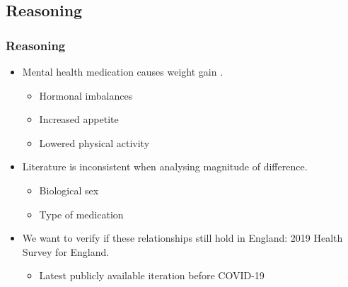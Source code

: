 \documentclass[
	11pt, %
]{beamer}
\begin{document}


\begin{frame} \subsection{Reasoning}
	\frametitle{Reasoning}
        \begin{itemize}
		\item 
                Mental health medication causes weight gain \citep{mazereel2020}.
		\begin{itemize}
			\item Hormonal imbalances
			\item Increased appetite
                \item Lowered physical activity
		\end{itemize}
  \end{itemize}

    \begin{itemize}
		\item 
                Literature is inconsistent when analysing magnitude of difference.
                \begin{itemize}
			\item Biological sex \citep{ALBERICH2019112506, Gates2016}
			\item Type of medication
   \citep{alonso, Vanina2002,mahli}
		\end{itemize}
  
	   \item We want to verify if these relationships still hold in England: 2019 Health Survey for England.
        \begin{itemize}
			\item Latest publicly available iteration before COVID-19
	   \end{itemize}
    \end{itemize}
 
 \end{frame}







\end{document}
